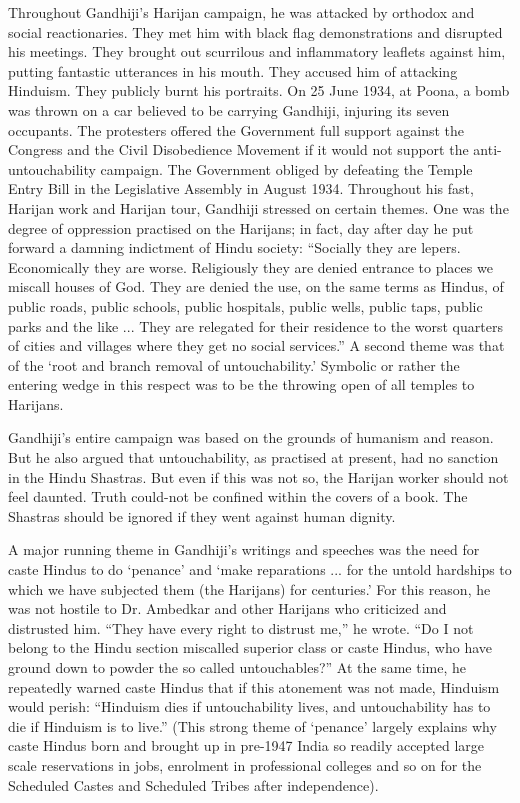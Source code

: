 \begin{multicols}{2}
Throughout Gandhiji's Harijan campaign, he was attacked by orthodox and social reactionaries. They met him with black flag demonstrations and disrupted his meetings. They brought out scurrilous and inflammatory leaflets against him, putting fantastic utterances in his mouth. They accused him of attacking Hinduism. They publicly burnt his portraits. On 25 June 1934, at Poona, a bomb was thrown on a car believed to be carrying Gandhiji, injuring its seven occupants. The protesters offered the Government full support against the Congress and the Civil Disobedience Movement if it would not support the anti-untouchability campaign. The Government obliged by defeating the Temple Entry Bill in the Legislative Assembly in August 1934. Throughout his fast, Harijan work and Harijan tour, Gandhiji stressed on certain themes. One was the degree of oppression practised on the Harijans; in fact, day after day he put forward a damning indictment of Hindu society: ``Socially they are lepers. Economically they are worse. Religiously they are denied entrance to places we miscall houses of God. They are denied the use, on the same terms as Hindus, of public roads, public schools, public hospitals, public wells, public taps, public parks and the like ... They are relegated for their residence to the worst quarters of cities and villages where they get no social services.'' A second theme was that of the `root and branch removal of untouchability.' Symbolic or rather the entering wedge in this respect was to be the throwing open of all temples to Harijans.

Gandhiji's entire campaign was based on the grounds of humanism and reason. But he also argued that untouchability, as practised at present, had no sanction in the Hindu Shastras. But even if this was not so, the Harijan worker should not feel daunted. Truth could-not be confined within the covers of a book. The Shastras should be ignored if they went against human dignity.

A major running theme in Gandhiji's writings and speeches was the need for caste Hindus to do `penance' and `make reparations ... for the untold hardships to which we have subjected them (the Harijans) for centuries.' For this reason, he was not hostile to Dr. Ambedkar and other Harijans who criticized and distrusted him. ``They have every right to distrust me,'' he wrote. ``Do I not belong to the Hindu section miscalled superior class or caste Hindus, who have ground down to powder the so called untouchables?'' At the same time, he repeatedly warned caste Hindus that if this atonement was not made, Hinduism would perish: ``Hinduism dies if untouchability lives, and untouchability has to die if Hinduism is to live.'' (This strong theme of `penance' largely explains why caste Hindus born and brought up in pre-1947 India so readily accepted large scale reservations in jobs, enrolment in professional colleges and so on for the Scheduled Castes and Scheduled Tribes after independence).


\end{multicols}
